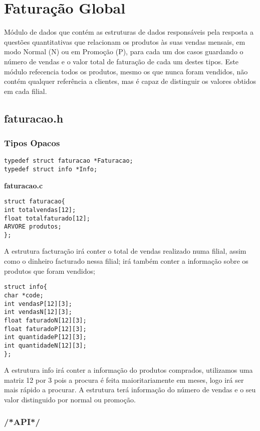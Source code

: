 \section{Faturação Global}

Módulo de dados que contém as estruturas de dados responsáveis pela resposta a questões quantitativas que relacionam os produtos às suas vendas mensais, em modo Normal (N) ou em Promoção (P), para cada um dos casos guardando o número de vendas e o valor total de faturação de cada um destes tipos. Este módulo refecencia todos os produtos, mesmo os que nunca foram vendidos, não contém qualquer referência a clientes, mas é capaz de distinguir os valores obtidos em cada filial. 

\subsection{faturacao.h}

\subsubsection{Tipos Opacos}
\begin{Verbatim}
typedef struct faturacao *Faturacao;
typedef struct info *Info;
\end{Verbatim}

\textbf{faturacao.c}
\begin{verbatim}
struct faturacao{
int totalvendas[12];
float totalfaturado[12];
ARVORE produtos;
};
\end{verbatim}

A estrutura facturação irá conter o total de vendas realizado numa filial, assim como o dinheiro facturado nessa filial; irá também conter a informação sobre os produtos que foram vendidos; 

\begin{verbatim}
struct info{
char *code;
int vendasP[12][3];
int vendasN[12][3];
float faturadoN[12][3];
float faturadoP[12][3];
int quantidadeP[12][3];
int quantidadeN[12][3];
};
\end{verbatim}

A estrutura info irá conter a informação  do produtos comprados, utilizamos uma matriz 12 por 3 pois a procura é feita maioritariamente em meses, logo irá ser mais rápido a procurar. A estrutura terá informação do número de vendas e o seu valor distinguido por normal ou promoção. 

\subsubsection{/*API*/}

